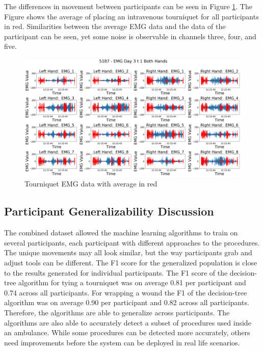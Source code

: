 The differences in movement between participants can be seen in Figure \ref{fig:5187emgday3t1average}. The Figure shows the average of placing an intravenous tourniquet for all participants in red. Similarities between the average EMG data and the data of the participant can be seen, yet some noise is observable in channels three, four, and five.
\begin{figure}[!h]
	\centering
	\includegraphics[width=\linewidth]{pictures/5187_EMG_Day3_t_1_average}
	\caption{Tourniquet EMG data with average in red}
	\label{fig:5187emgday3t1average}
\end{figure}

\subsection{Participant Generalizability Discussion}
\label{sec:Results:Generalizability:Discussion}

The combined dataset allowed the machine learning algorithms to train on several participants, each participant with different approaches to the procedures. The unique movements may all look similar, but the way participants grab and adjust tools can be different. 
The F1 score for the generalized population is close to the results generated for individual participants. The F1 score of the decision-tree algorithm for tying a tourniquet was on average 0.81 per participant and 0.74 across all participants. For wrapping a wound the F1 of the decision-tree algorithm was on average 0.90 per participant and 0.82 across all participants. Therefore, the algorithms are able to generalize across participants. The algorithms are also able to accurately detect a subset of procedures used inside an ambulance. While some procedures can be detected more accurately, others need improvements before the system can be deployed in real life scenarios.


